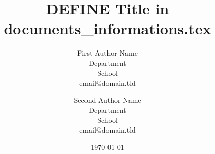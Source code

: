 \title{DEFINE Title in documents\_informations.tex}

\author{
    First Author Name \\
    Department \\
    School \\
    email@domain.tld \\
  \and
    Second Author Name \\
    Department \\
    School \\
    email@domain.tld \\
}

\date{\today}
\newcommand{\dateOfApplication}{\date{\today}}

\newcommand{\keywords}{Keyword1, Keyword2, Keyword3}


\newcommand{\examinerOne}{
  First Examiner Name \\
  Department \\
  School
}

\newcommand{\examinerTwo}{
  Second Examiner Name \\
  Department \\
  School
}

\newcommand{\typeOfThesis}{Bachelorthesis}
\newcommand{\faculty}{Communication and Environment}
\newcommand{\studyprogram}{Communication and Information Engineering}
\newcommand{\town}{Kamp-Lintfort}
